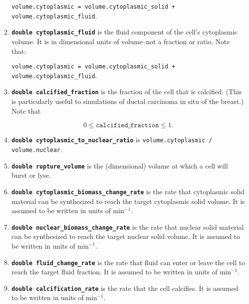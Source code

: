 \documentclass[12pt]{article}
\newcommand{\beq}{\begin{equation}}
\newcommand{\eeq}{\end{equation}}
\renewcommand{\v}{\verb}
\newcommand{\smallcode}[1]{\textbf{\texttt{#1}}}
\begin{document}
\begin{enumerate}
\v|volume.cytoplasmic = volume.cytoplasmic_solid + volume.cytoplasmic_fluid|.

\item 
\smallcode{double cytoplasmic\_fluid} is the fluid component of the cell's cytoplasmic volume. It is in dimensional units 
of volume--not a fraction or ratio. Note that: 

\v|volume.cytoplasmic = volume.cytoplasmic_solid + volume.cytoplasmic_fluid|.

\item 
\smallcode{double calcified\_fraction} is the fraction of the cell that is calcified. (This is particularly useful to simulations 
of ductal carcinoma in situ of the breast.) Note that 

\beq
0 \le \texttt{calcified\_fraction} \le 1.
\eeq
     
\item 
\smallcode{double cytoplasmic\_to\_nuclear\_ratio} is \v|volume.cytoplasmic / volume.nuclear|. 

\item 
\smallcode{double rupture\_volume} is the (dimensional) volume at which a cell will burst or lyse.  


\item 
\smallcode{double cytoplasmic\_biomass\_change\_rate} is the rate that cytoplasmic solid material can be synthesized to reach 
the target cytoplasmic solid volume. It is assumed to be written in units of $\textrm{min}^{-1}$.

\item 
\smallcode{double nuclear\_biomass\_change\_rate} is the rate that nuclear solid material can be synthesized to reach 
the target nuclear solid volume. It is assumed to be written in units of $\textrm{min}^{-1}$.

\item 
\smallcode{double fluid\_change\_rate} is the rate that fluid can enter or leave the cell to reach the target 
fluid fraction. It is assumed to be written in units of $\textrm{min}^{-1}$.

\item 
\smallcode{double calcification\_rate} is the rate that the cell calcifies. It is assumed to be written in units of $\textrm{min}^{-1}$.


\end{enumerate}
\end{document}
